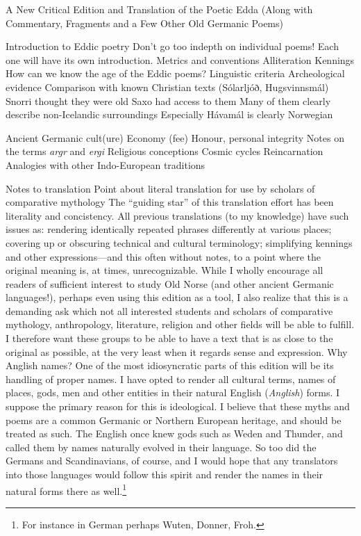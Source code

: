 A New Critical Edition and Translation of the Poetic Edda
(Along with Commentary, Fragments and a Few Other Old Germanic Poems)

Introduction to Eddic poetry
  Don't go too indepth on individual poems! Each one will have its own introduction.
  Metrics and conventions
    Alliteration
    Kennings
  How can we know the age of the Eddic poems?
    Linguistic criteria
    Archeological evidence
    Comparison with known Christian texts (Sólarljóð, Hugsvinnsmál)
    Snorri thought they were old
    Saxo had access to them
    Many of them clearly describe non-Icelandic surroundings
      Especially Hávamál is clearly Norwegian

Ancient Germanic cult(ure)
  Economy (fee)
  Honour, personal integrity
    Notes on the terms \emph{argr} and \emph{ergi}
  Religious conceptions
    Cosmic cycles
    Reincarnation
    Analogies with other Indo-European traditions

Notes to translation
  Point about literal translation for use by scholars of comparative mythology
    The “guiding star” of this translation effort has been literality and concistency. All previous translations (to my knowledge) have such issues as: rendering identically repeated phrases differently at various places; covering up or obscuring technical and cultural terminology; simplifying kennings and other expressions—and this often without notes, to a point where the original meaning is, at times, unrecognizable.
    While I wholly encourage all readers of sufficient interest to study Old Norse (and other ancient Germanic languages!), perhaps even using this edition as a tool, I also realize that this is a demanding ask which not all interested students and scholars of comparative mythology, anthropology, literature, religion and other fields will be able to fulfill. I therefore want these groups to be able to have a text that is as close to the original as possible, at the very least when it regards sense and expression.
  Why Anglish names?
    One of the most idiosyncratic parts of this edition will be its handling of proper names. I have opted to render all cultural terms, names of places, gods, men and other entities in their natural English (\emph{Anglish}) forms. I suppose the primary reason for this is ideological. I believe that these myths and poems are a common Germanic or Northern European heritage, and should be treated as such. The English once knew gods such as Weden and Thunder, and called them by names naturally evolved in their language. So too did the Germans and Scandinavians, of course, and I would hope that any translators into those languages would follow this spirit and render the names in their natural forms there as well.\footnote{For instance in German perhaps Wuten, Donner, Froh.}

